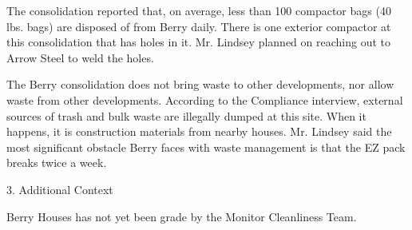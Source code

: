 The consolidation reported that, on average, less than 100 compactor bags (40 lbs. bags) are disposed of from Berry daily. There is one exterior compactor at this consolidation that has holes in it. Mr. Lindsey planned on reaching out to Arrow Steel to weld the holes. 

The Berry consolidation does not bring waste to other developments, nor allow waste from other developments. According to the Compliance interview, external sources of trash and bulk waste are illegally dumped at this site. When it happens, it is construction materials from nearby houses. Mr. Lindsey said the most significant obstacle Berry faces with waste management is that the EZ pack breaks twice a week.

3. Additional Context 

Berry Houses has not yet been grade by the Monitor Cleanliness Team.